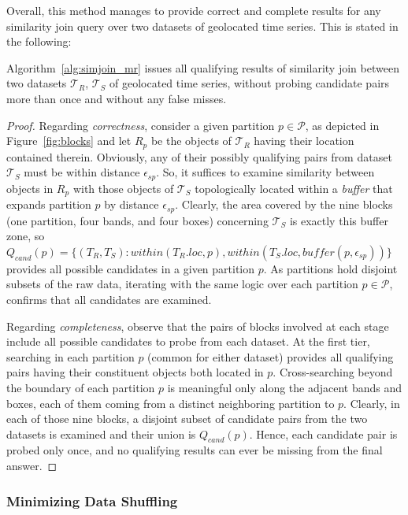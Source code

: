 Overall, this method manages to provide correct and complete results for any similarity join query over two datasets of geolocated time series. This is stated in the following:
\begin{mylemma}
Algorithm~\ref{alg:simjoin_mr} issues all qualifying results of similarity join between two datasets $\mathcal{T}_{R}$, $\mathcal{T}_{S}$ of geolocated time series, without probing candidate pairs more than once and without any false misses.
\end{mylemma}
\vspace{-3mm}
\begin{proof} Regarding {\em correctness}, consider a given partition $p \in \mathcal{P}$, as depicted in Figure~\ref{fig:blocks} and let $R_{p}$ be the objects of $\mathcal{T}_{R}$ having their location contained therein. Obviously, any of their possibly qualifying pairs from dataset $\mathcal{T}_{S}$ must be within distance $\epsilon_{sp}$. So, it suffices to examine similarity between objects in $R_{p}$ with those objects of $\mathcal{T}_{S}$ topologically located within a {\em buffer} that expands partition $p$ by distance $\epsilon_{sp}$. Clearly, the area covered by the nine blocks (one partition, four bands, and four boxes) concerning $\mathcal{T}_{S}$ is exactly this buffer zone, so $Q_{cand}(p) = \{ (T_{R}, T_{S} ): within(T_{R}.loc, p), within(T_{S}.loc, buffer(p, \epsilon_{sp})) \}$ provides all possible candidates in a given partition $p$. As partitions hold disjoint subsets of the raw data, iterating with the same logic over each partition $p \in \mathcal{P}$, confirms that all candidates are examined. 

Regarding {\em completeness}, observe that the pairs of blocks involved at each stage include all possible candidates to probe from each dataset. At the first tier, searching in each partition $p$ (common for either dataset) provides all qualifying pairs having their constituent objects both located in $p$. Cross-searching beyond the boundary of each partition $p$ is meaningful only along the adjacent bands and boxes, each of them coming from a distinct neighboring partition to $p$. Clearly, in each of those nine blocks, a disjoint subset of candidate pairs from the two datasets is examined and their union is $Q_{cand}(p)$. Hence, each candidate pair is probed only once, and no qualifying results can ever be missing from the final answer.
\end{proof}


\subsubsection{Minimizing Data Shuffling}
\label{subsec:optimized}

